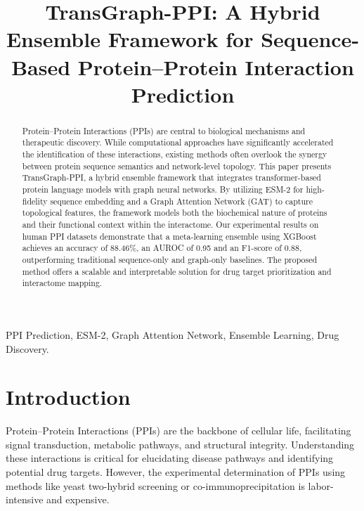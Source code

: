 \documentclass[conference]{IEEEtran}
\begin{document}
\title{TransGraph-PPI: A Hybrid Ensemble Framework for Sequence-Based Protein–Protein Interaction Prediction}

\author{
\and
{}
}

\maketitle

\begin{abstract}
Protein–Protein Interactions (PPIs) are central to biological mechanisms and therapeutic discovery. While computational approaches have significantly accelerated the identification of these interactions, existing methods often overlook the synergy between protein sequence semantics and network-level topology. This paper presents TransGraph-PPI, a hybrid ensemble framework that integrates transformer-based protein language models with graph neural networks. By utilizing ESM-2 for high-fidelity sequence embedding and a Graph Attention Network (GAT) to capture topological features, the framework models both the biochemical nature of proteins and their functional context within the interactome. Our experimental results on human PPI datasets demonstrate that a meta-learning ensemble using XGBoost achieves an accuracy of 88.46\%, an AUROC of 0.95 and an F1-score of 0.88, outperforming traditional sequence-only and graph-only baselines. The proposed method offers a scalable and interpretable solution for drug target prioritization and interactome mapping.
\end{abstract}

\begin{IEEEkeywords}
PPI Prediction, ESM-2, Graph Attention Network, Ensemble Learning, Drug Discovery.
\end{IEEEkeywords}

\section{Introduction}
Protein–Protein Interactions (PPIs) are the backbone of cellular life, facilitating signal transduction, metabolic pathways, and structural integrity. Understanding these interactions is critical for elucidating disease pathways and identifying potential drug targets. However, the experimental determination of PPIs using methods like yeast two-hybrid screening or co-immunoprecipitation is labor-intensive and expensive.
\end{document}
